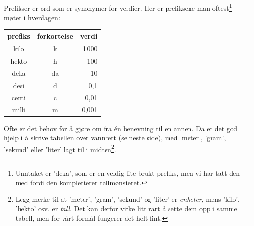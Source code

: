 Prefikser er ord som er synonymer for verdier. Her er prefiksene man oftest\footnote{Unntaket er 'deka', som er en veldig lite brukt prefiks, men vi har tatt den med fordi den kompletterer tallmønsteret.} møter i hverdagen:\tbs
\begin{center}
	\begin{tabular}{c|c|r}
		\textbf{prefiks} & \textbf{forkortelse}&\textbf{verdi} \\ \hline
		kilo & k & 1\,000\phantom{000\;}\\\hline
		hekto & h & 100\phantom{000\;}\\\hline
		deka & da & 10\phantom{000\;}\\\hline
		desi & d & 0,1\phantom{0\,\;}\\\hline
		centi & c & 0,01\phantom{\,\;}\\\hline
		milli & m & 0,001\\\hline		
	\end{tabular}
\end{center}

Ofte er det behov for å gjøre om fra én benevning til en annen. Da er det god hjelp i å skrive tabellen over vannrett (se neste side), med 'meter', 'gram', 'sekund' eller 'liter' lagt til i midten\footnote{Legg merke til at 'meter', 'gram', 'sekund' og 'liter' er \textsl{enheter}, mens 'kilo', 'hekto' osv. er \textsl{tall}. Det kan derfor virke litt rart å sette dem opp i samme tabell, men for vårt formål fungerer det helt fint.}. 
 \regv
\newpage
{}


